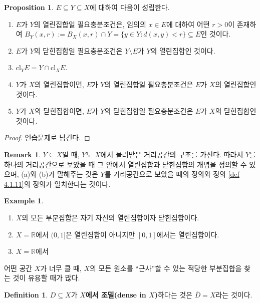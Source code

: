 \documentclass[11pt]{book}
\numberwithin{equation}{chapter}
\def\RR{\mathbb{R}}
\theoremstyle{definition}
\newtheorem{prop}[thm]{Proposition}
\newtheorem{defn}[thm]{Definition}
\newtheorem*{rem}{Remark}
\newtheorem*{ex}{Example}
\begin{document}
\begin{prop}
    \(E \subseteq Y \subseteq X\)에 대하여 다음이 성립한다. 
    \begin{enumerate} [label=(\alph*), leftmargin=2\parindent]
        \item \(E\)가 \(Y\)의 열린집합일 필요충분조건은, 임의의 \(x \in E\)에 대하여 어떤 \(r > 0\)이 존재하여 \(B_Y(x, r) := B_X(x, r) \cap Y = \{y \in Y : d(x, y) < r\} \subseteq E\)인 것이다.
        \item \(E\)가 \(Y\)의 닫힌집합일 필요충분조건은 \(Y \setminus E\)가 \(Y\)의 열린집합인 것이다.
        \item \(\text{cl}_Y E = Y \cap \text{cl}_X E \).
        \item \(Y\)가 \(X\)의 열린집합이면, \(E\)가 \(Y\)의 열린집합일 필요충분조건은 \(E\)가 \(X\)의 열린집합인 것이다.
        \item \(Y\)가 \(X\)의 닫힌집합이면, \(E\)가 \(Y\)의 닫힌집합일 필요충분조건은 \(E\)가 \(X\)의 닫힌집합인 것이다.
    \end{enumerate}
\end{prop}
\begin{proof}
    연습문제로 남긴다.
\end{proof}
\begin{rem}
    \(Y \subseteq X\)일 때, \(Y\)도 \(X\)에서 물려받은 거리공간의 구조를 가진다. 따라서 \(Y\)를 하나의 거리공간으로 보았을 때 그 안에서 열린집합과 닫힌집합의 개념을 정의할 수 있으며, (a)와 (b)가 말해주는 것은 \(Y\)를 거리공간으로 보았을 때의 정의와 정의 \ref{def 4.1.11}의 정의가 일치한다는 것이다.
\end{rem}

\begin{ex}
    \quad

    \begin{enumerate} [label=(\alph*), leftmargin=2\parindent]
        \item \(X\)의 모든 부분집합은 자기 자신의 열린집합이자 닫힌집합이다.
        \item \(X = \RR\)에서 \((0, 1]\)은 열린집합이 아니지만 \([0, 1]\)에서는 열린집합이다.
        \item \(X = \RR\)에서 
    \end{enumerate}
\end{ex}

어떤 공간 \(X\)가 너무 클 때, \(X\)의 모든 원소를 ``근사''할 수 있는 적당한 부분집합을 찾는 것이 유용할 때가 많다.

\begin{defn}
    \(D \subseteq X\)가 \textbf{\(X\)에서 조밀(dense in \(X\))}하다는 것은 \(\overline{D} = X\)라는 것이다.
\end{defn}
\end{document}
